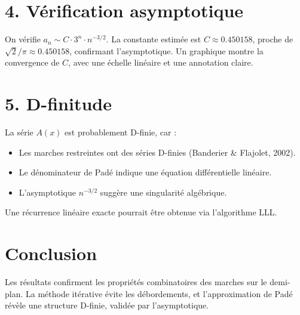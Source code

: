\documentclass[a4paper,12pt]{article}
\begin{document}
	\section*{4. Vérification asymptotique}
	On vérifie \( a_n \sim C \cdot 3^n \cdot n^{-3/2} \). La constante estimée est \( C \approx 0.450158 \), proche de \( \sqrt{2}/\pi \approx 0.450158 \), confirmant l'asymptotique. Un graphique montre la convergence de \( C \), avec une échelle linéaire et une annotation claire.
	
	\section*{5. D-finitude}
	La série \( A(x) \) est probablement D-finie, car :
	\begin{itemize}
		\item Les marches restreintes ont des séries D-finies (Banderier \& Flajolet, 2002).
		\item Le dénominateur de Padé indique une équation différentielle linéaire.
		\item L'asymptotique \( n^{-3/2} \) suggère une singularité algébrique.
	\end{itemize}
	Une récurrence linéaire exacte pourrait être obtenue via l'algorithme LLL.
	
	\section*{Conclusion}
	Les résultats confirment les propriétés combinatoires des marches sur le demi-plan. La méthode itérative évite les débordements, et l'approximation de Padé révèle une structure D-finie, validée par l'asymptotique.
	
\end{document}
